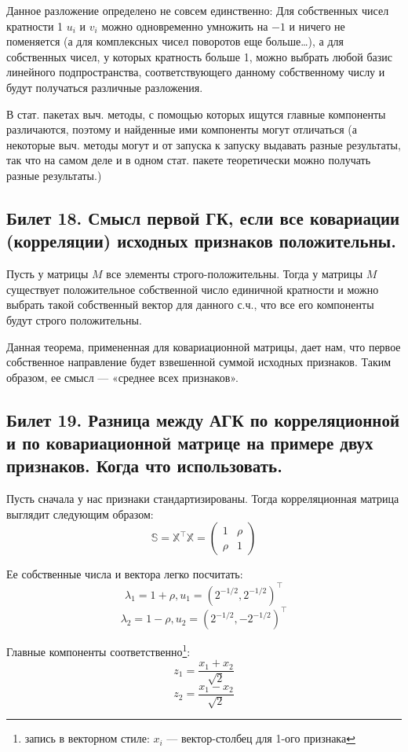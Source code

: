 Данное разложение определено не совсем единственно: Для собственных чисел кратности 1 $u_i$ и $v_i$ можно одновременно умножить на $-1$ и ничего не поменяется (а для комплексных чисел поворотов еще больше…), а 
для собственных чисел, у которых кратность больше 1, можно выбрать любой базис линейного подпространства, соответствующего данному собственному числу и будут получаться различные разложения. 

В стат. пакетах выч. методы, с помощью которых ищутся главные компоненты различаются, поэтому и найденные ими компоненты могут отличаться (а некоторые выч. методы могут и от запуска к запуску выдавать разные результаты, так что на самом деле и в одном стат. пакете теоретически можно получать разные результаты.)

\subsection{Билет 18. Смысл первой ГК, если все ковариации (корреляции) исходных признаков положительны.}
\begin{thm}
Пусть у матрицы $M$ все элементы строго-положительны. Тогда у матрицы $M$ существует положительное собственной число единичной кратности и можно выбрать такой собственный вектор для данного с.ч., что все его компоненты будут строго положительны.
\end{thm}
Данная теорема, примененная для ковариационной матрицы, дает нам, что первое собственное направление будет взвешенной суммой исходных признаков. Таким образом, ее смысл — «среднее всех признаков». 

\subsection{Билет 19. Разница между АГК по корреляционной и по ковариационной матрице на примере двух признаков.
Когда что использовать.}  

Пусть сначала у нас признаки стандартизированы. Тогда корреляционная матрица выглядит следующим образом:
$$\mathbb{S} = \mathbb{X}^{\intercal} \mathbb{X} = \begin{pmatrix}
1 & \rho \\
\rho & 1
\end{pmatrix}
$$

Ее собственные числа и вектора легко посчитать:
$$\lambda_1  = 1+\rho, u_1 =(2^{-1/2}, 2^{-1/2})^{\intercal}$$
$$\lambda_2 = 1-\rho, u_2 = (2^{-1/2},-2^{-1/2})^{\intercal}$$

Главные компоненты соответственно\footnote{запись в векторном стиле: $x_i$ — вектор-столбец для 1-ого признака}:
 $$ z_1 = \frac{x_1+x_2}{\sqrt{2}}$$
 $$z_2 = \frac{x_1-x_2}{\sqrt{2}}$$

